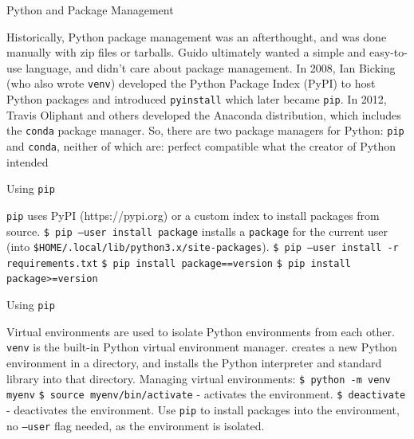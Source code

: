 \documentclass[aspectratio=169]{beamer}
\begin{document}
    \begin{frame}{Python and Package Management}
        \begin{outline}
            \1 Historically, Python package management was an afterthought, and was done manually with zip files or tarballs.
                \2 Guido ultimately wanted a simple and easy-to-use language, and didn't care about package management.
            \1 In 2008, Ian Bicking (who also wrote \texttt{venv}) developed the Python Package Index (PyPI) to host Python packages and introduced \texttt{pyinstall} which later became \texttt{pip}.
            \1 In 2012, Travis Oliphant and others developed the Anaconda distribution, which includes the \texttt{conda} package manager.
            \1 So, there are two package managers for Python: \texttt{pip} and \texttt{conda}, neither of which are:
                \2 perfect
                \2 compatible
                \2 what the creator of Python intended 
        \end{outline}
    \end{frame} 

    \begin{frame}{Using \texttt{pip}}
        \begin{outline}
            \1 \texttt{pip} uses PyPI (https://pypi.org) or a custom index to install packages from source. 
            \1 \texttt{\$ pip --user install package} 
                \2 installs a \texttt{package} for the current user (into \texttt{\$HOME/.local/lib/python3.x/site-packages}).
            \1 \texttt{\$ pip --user install -r requirements.txt}             \1 \texttt{\$ pip install package==version}
            \1 \texttt{\$ pip install package>=version}
        \end{outline}
    \end{frame}

    \begin{frame}{Using \texttt{pip}}
        \begin{outline}
            \1 Virtual environments are used to isolate Python environments from each other.
            \1 \texttt{venv} is the built-in Python virtual environment manager.
                \2 creates a new Python environment in a directory, and installs the Python interpreter and standard library into that directory.
            \1 Managing virtual environments:
                \2 \texttt{\$ python -m venv myenv}
                \2 \texttt{\$ source myenv/bin/activate} - activates the environment.
                \2 \texttt{\$ deactivate} - deactivates the environment.
            \1 Use \texttt{pip} to install packages into the environment, no \texttt{--user} flag needed, as the environment is isolated.
        \end{outline}
    \end{frame}
\end{document}
